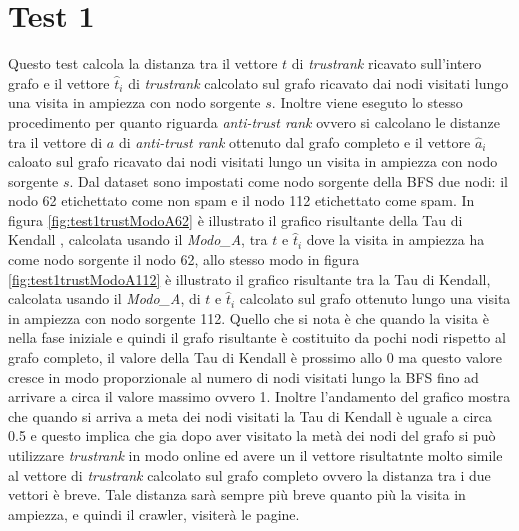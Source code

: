  \section{Test 1}
 Questo test calcola la distanza tra il vettore \(t\) di \textit{trustrank} ricavato sull'intero grafo e il vettore \(\hat{t}_i\) di \textit{trustrank} calcolato sul grafo ricavato dai nodi visitati lungo una visita in ampiezza con nodo sorgente \(s\). Inoltre viene eseguto lo stesso procedimento per quanto riguarda \textit{anti-trust rank} ovvero si calcolano le distanze tra il vettore di \(a\) di \textit{anti-trust rank} ottenuto dal grafo completo e il vettore \(\hat{a}_i\)  caloato sul grafo ricavato dai nodi visitati lungo  un visita in ampiezza con nodo sorgente \(s\). Dal dataset sono impostati come nodo sorgente della BFS due nodi: il nodo 62 etichettato come non spam e il nodo 112 etichettato come spam. In figura \ref{fig:test1trustModoA62} è illustrato il grafico risultante della Tau di Kendall , calcolata usando il \textit{Modo\_A}, tra \(t\) e \(\hat{t}_i\) dove la visita in ampiezza ha come nodo sorgente il nodo 62, allo stesso modo in figura \ref{fig:test1trustModoA112} è illustrato il grafico risultante tra la Tau di Kendall, calcolata usando il \textit{Modo\_A}, di \(t\) e \(\hat{t}_i\) calcolato sul grafo ottenuto lungo una visita in ampiezza con nodo sorgente 112. Quello che si nota è che quando la visita è nella fase iniziale e quindi il grafo risultante è costituito da pochi nodi rispetto al grafo completo, il valore della Tau di Kendall è prossimo allo 0 ma questo valore cresce in modo proporzionale al numero di nodi visitati lungo la BFS fino ad arrivare a circa il valore massimo ovvero 1. Inoltre l'andamento del grafico mostra che quando si arriva a meta dei nodi visitati la Tau di Kendall è uguale a circa 0.5 e questo implica che gia dopo aver visitato la metà dei nodi del grafo si può utilizzare \textit{trustrank} in modo online ed avere un il vettore risultatnte molto simile al vettore di \textit{trustrank} calcolato sul grafo completo ovvero la distanza tra i due vettori è breve. Tale distanza sarà sempre più breve quanto più la visita in ampiezza, e quindi il crawler, visiterà le pagine.
